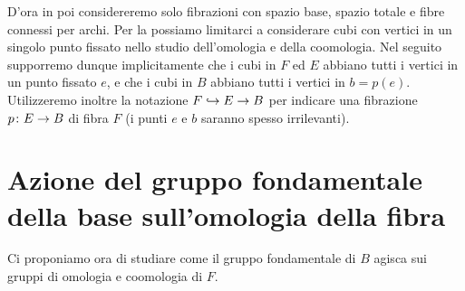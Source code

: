 D'ora in poi considereremo solo fibrazioni con spazio base, spazio totale e fibre connessi per archi. Per la  possiamo limitarci a considerare cubi con vertici in un singolo punto fissato nello studio dell'omologia e della coomologia. Nel seguito supporremo dunque implicitamente che i cubi in \(F\) ed \(E\) abbiano tutti i vertici in un punto fissato \(e\), e che i cubi in \(B\) abbiano tutti i vertici in \(b=p(e)\). Utilizzeremo inoltre la notazione \(F\hookrightarrow E\to B\) per indicare una fibrazione \(\map{p}{E}{B}\) di fibra \(F\) (i punti \(e\) e \(b\) saranno spesso irrilevanti).

\section{Azione del gruppo fondamentale della base sull'omologia della fibra}

Ci proponiamo ora di studiare come il gruppo fondamentale di \(B\) agisca sui gruppi di omologia e coomologia di \(F\).

